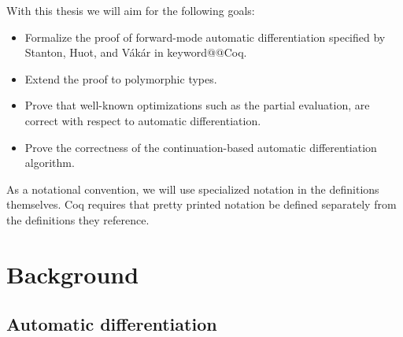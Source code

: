 \documentclass[12pt, final]{article}
\makeatletter
\def\Vakar{V\'{a}k\'{a}r}
\def\<#1>{\csname keyword@@#1\endcsname}
\makeatother
\begin{document}

With this thesis we will aim for the following goals:
\begin{itemize}
  \item Formalize the proof of forward-mode automatic differentiation specified by Stanton, Huot, and \Vakar{} \cite{huot2020correctness} in \<Coq>.
  \item Extend the proof to polymorphic types.
  \item Prove that well-known optimizations such as the partial evaluation, are correct with respect to automatic differentiation.
  \item Prove the correctness of the continuation-based automatic differentiation algorithm.
\end{itemize}


As a notational convention, we will use specialized notation in the definitions themselves. Coq requires that pretty printed notation be defined separately from the definitions they reference.

\section{Background}

\subsection{Automatic differentiation}
\end{document}
